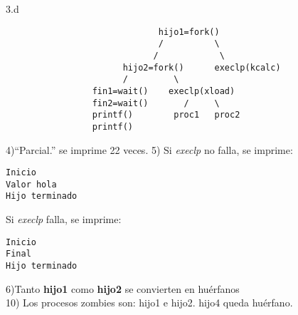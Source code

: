 \documentclass{article}
\begin{document}
3.d
\begin{verbatim}
                              hijo1=fork()
                              /          \
                             /            \
                       hijo2=fork()      execlp(kcalc)
                       /         \
                 fin1=wait()    execlp(xload)
                 fin2=wait()       /     \
                 printf()        proc1   proc2
                 printf()
\end{verbatim}

4)``Parcial.'' se imprime 22 veces.
5) Si \emph{execlp} no falla, se imprime:\\
\begin{verbatim}
Inicio
Valor hola
Hijo terminado
\end{verbatim}
 Si \emph{execlp} falla, se imprime:\\
\begin{verbatim}
Inicio
Final
Hijo terminado
\end{verbatim}
6)Tanto \textbf{hijo1} como \textbf{hijo2} se convierten en hu\'erfanos\\
10) Los procesos zombies son: hijo1 e hijo2. hijo4 queda hu\'erfano.
\end{document}
